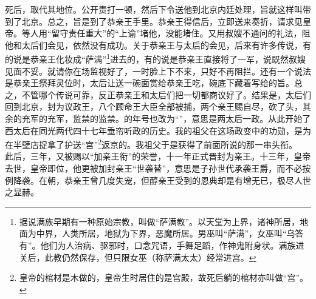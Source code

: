 {死后，取代其地位。}公开责打一顿，然后下令送他到北京内廷处理，旨就这样叫带到了北京。总之，旨是到了恭亲王手里。恭亲王得信后，立即送来奏折，请求见皇帝。等人用“留守责任重大”的“上谕”堵他，没能堵住。又用叔嫂不通问的礼法，阻他和太后们会见，依然没有成功。关于恭亲王与太后的会见，后来有许多传说，有的说是恭亲王化妆成“萨满”\footnote{据说满族早期有一种原始宗教，叫做“萨满教”。以天堂为上界，诸神所居，地面为中界，人类所居，地狱为下界，恶魔所居。男巫叫“萨满”，女巫叫“乌答有”。他们为人治病、驱邪时，口念咒语，手舞足蹈，作神鬼附身状。满族进关后，此教仍然保存，但只限女巫（称萨满太太）经常进宫。}进去的，有的说是恭亲王直接将了一军，说既然叔嫂见面不妥。就请你在场监视好了，一时脸上下不来，只好不再阻拦。还有一个说法是恭亲王祭拜灵位时，太后让送一碗面赏给恭亲王吃，碗底下藏着写给的旨。总之，不管哪个传说可靠，反正恭亲王和太后们把一切都商议好了。结果是，太后们回到北京，封为议政王，八个顾命王大臣全部被捕，两个亲王赐自尽，砍了头，其余的充军的充军，监禁的监禁。的年号也改为“”，意思是两太后一政。从此开始了西太后在同光两代四十七年垂帘听政的历史。我的祖父在这场政变中的功勋，是为在半壁店捉拿了护送“宫”\footnote{皇帝的棺材是木做的，皇帝生时居住的是宫殿，故死后躺的棺材亦叫做“宫”。}返京的。我祖父于是获得了前面所说的那一串头衔。\\

此后，三年，又被赐以“加亲王衔”的荣誉，十一年正式晋封为亲王。十三年，皇帝去世，皇帝即位，他更被加封亲王“世袭替”，意思是子孙世代承袭王爵，而不必按例降袭。在朝，恭亲王曾几度失宠，但醇亲王受到的恩典却是有增无已，极尽人世之显赫。\\

